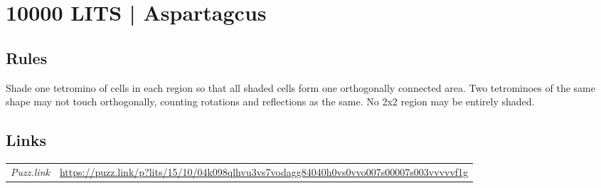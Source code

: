 \section[10000 LITS | Aspartagcus {[\emph{LITS}]}]{10000 LITS | {\normalfont Aspartagcus}}
\label{sec:56-10000-lits-aspartagcus}

\subsection*{Rules}
\begin{markdown}
Shade one tetromino of cells in each region so that all shaded cells form one orthogonally connected area. Two tetrominoes of the same shape may not touch orthogonally, counting rotations and reflections as the same. No 2x2 region may be entirely shaded.
\end{markdown}
\subsection*{Links}
\begin{tabularx}{\textwidth}{l X}
\emph{Puzz.link} & \url{https://puzz.link/p?lits/15/10/04k098qlhvu3vs7vodagg84040h0vs0vvo007s00007s003vvvvvf1g} \\
\end{tabularx}
\pagebreak
